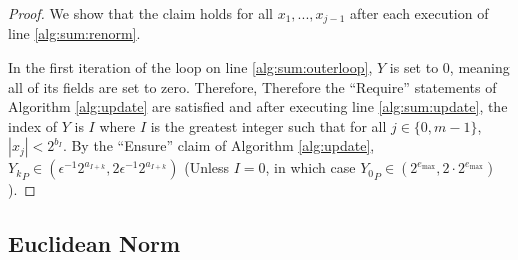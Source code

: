    \begin{proof}
      We show that the claim holds for all $x_1, ..., x_{j - 1}$ after each  execution of line \ref{alg:sum:renorm}.

      In the first iteration of the loop on line \ref{alg:sum:outerloop}, $Y$ is set to 0, meaning all of its fields are set to zero. Therefore,  Therefore the ``Require'' statements of Algorithm \ref{alg:update} are satisfied and after executing line \ref{alg:sum:update}, the index of $Y$ is $I$ where $I$ is the greatest integer such that for all $j \in \{0, m - 1\}$, $|x_j| < 2^{b_I}$. By the ``Ensure'' claim of Algorithm \ref{alg:update}, ${Y_k}_P \in (\epsilon^{-1}  2^{a_{I + k}}, 2  \epsilon^{-1}  2^{a_{I + k}})$ (Unless $I = 0$, in which case ${Y_0}_P \in (2^{e_{\max}}, 2 \cdot 2^{e_{\max}})$).
    \end{proof}

  \subsection{Euclidean Norm}
    \label{sec:compositeops_nrm}
